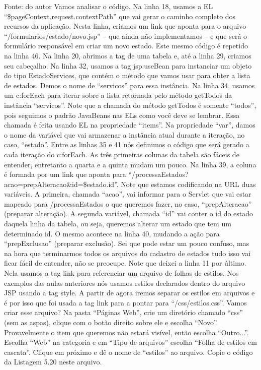 Fonte: do autor
Vamos analisar o código. Na linha 18, usamos a EL ``\${pageContext.request.contextPath}'' que vai gerar o caminho completo dos recursos da aplicação. Nesta linha, criamos um link que aponta para o arquivo ``/formularios/estado/novo.jsp'' – que ainda não implementamos – e que será o formulário responsável em criar um novo estado. Este mesmo código é repetido na linha 46. Na linha 20, abrimos a tag de uma tabela e, até a linha 29, criamos seu cabeçalho. Na linha 32, usamos a tag jsp:useBean para instanciar um objeto do tipo EstadoServices, que contém o método que vamos usar para obter a lista de estados. Demos o nome de ``servicos'' para essa instância. Na linha 34, usamos um c:forEach para iterar sobre a lista retornada pelo método getTodos da instância ``servicos''. Note que a chamada do método getTodos é somente ``todos'', pois seguimos o padrão JavaBeans nas ELs como você deve se lembrar. Essa chamada é feita usando EL na propriedade ``items''. Na propriedade ``var'', damos o nome da variável que vai armazenar a instância atual durante a iteração, no caso, ``estado''. Entre as linhas 35 e 41 nós definimos o código que será gerado a cada iteração do c:forEach. As três primeiras colunas da tabela são fáceis de entender, entretanto a quarta e a quinta mudam um pouco. Na linha 39, a coluna é formada por um link que aponta para ``/processaEstados?acao=prepAlteracao\&id=\${estado.id}''. Note que estamos codificando na URL duas variáveis. A primeira, chamada ``acao'', vai informar para o Servlet que vai estar mapeado para /processaEstados o que queremos fazer, no caso, ``prepAlteracao'' (preparar alteração). A segunda variável, chamada ``id'' vai conter o id do estado daquela linha da tabela, ou seja, queremos alterar um estado que tem um determinado id. O mesmo acontece na linha 40, mudando a ação para ``prepExclusao'' (preparar exclusão). Sei que pode estar um pouco confuso, mas na hora que terminarmos todos os arquivos do cadastro de estados tudo isso vai ficar fácil de entender, não se preocupe.
Note que deixei a linha 11 por último. Nela usamos a tag link para referenciar um arquivo de folhas de estilos. Nos exemplos das aulas anteriores nós usamos estilos declarados dentro do arquivo JSP usando a tag style. A partir de agora iremos separar os estilos em arquivos e é por isso que foi usada a tag link para a pontar para ``/css/estilos.css''. Vamos criar esse arquivo? Na pasta ``Páginas Web'', crie um diretório chamado ``css'' (sem as aspas), clique com o botão direito sobre ele e escolha ``Novo''. Provavelmente o item que queremos não estará visível, então escolha ``Outro...''. Escolha ``Web'' na categoria e em ``Tipo de arquivos'' escolha ``Folha de estilos em cascata''. Clique em próximo e dê o nome de ``estilos'' ao arquivo. Copie o código da Listagem 5.20 neste arquivo.








